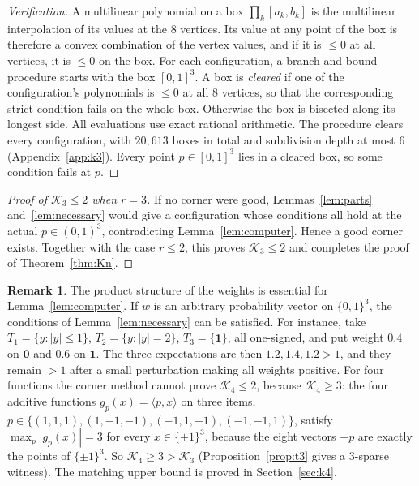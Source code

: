 \documentclass[11pt,letterpaper]{article}
\theoremstyle{definition}
\newtheorem{remark}[theorem]{Remark}
\newcommand{\cube}[1]{\{\pm1\}^{#1}}
\begin{document}
\begin{proof}[Verification]
A multilinear polynomial on a box $\prod_k[a_k,b_k]$ is the multilinear interpolation of its
values at the $8$ vertices. Its value at any point of the box is therefore a convex combination of
the vertex values, and if it is $\le0$ at all vertices, it is $\le0$ on the box. For each
configuration, a branch-and-bound procedure starts with the box $[0,1]^3$. A box is
\emph{cleared} if one of the configuration's polynomials is $\le0$ at all $8$ vertices, so that
the corresponding strict condition fails on the whole box. Otherwise the box is bisected along its
longest side. All evaluations use exact rational arithmetic. The procedure clears every
configuration, with $20{,}613$ boxes in total and subdivision depth at most $6$
(Appendix~\ref{app:k3}). Every point $p\in[0,1]^3$ lies in a cleared box, so some condition fails
at $p$.
\end{proof}

\begin{proof}[Proof of $\mathcal{K}_3\le2$ when $r=3$]
If no corner were good, Lemmas~\ref{lem:parts} and~\ref{lem:necessary} would give a configuration
whose conditions all hold at the actual $p\in(0,1)^3$, contradicting Lemma~\ref{lem:computer}.
Hence a good corner exists. Together with the case $r\le2$, this proves $\mathcal{K}_3\le2$ and completes
the proof of Theorem~\ref{thm:Kn}.
\end{proof}

\begin{remark}\label{rem:K4}
The product structure of the weights is essential for Lemma~\ref{lem:computer}. If $w$ is an
arbitrary probability vector on $\{0,1\}^3$, the conditions of Lemma~\ref{lem:necessary} can be
satisfied. For instance, take $T_1=\{y:|y|\le1\}$, $T_2=\{y:|y|=2\}$, $T_3=\{\mathbf 1\}$, all
one-signed, and put weight $0.4$ on $\mathbf 0$ and $0.6$ on $\mathbf 1$. The three expectations
are then $1.2,1.4,1.2>1$, and they remain $>1$ after a small perturbation making all weights
positive. For four functions the corner method cannot prove $\mathcal{K}_4\le2$, because $\mathcal{K}_4\ge3$: the four additive
functions $g_p(x)=\langle p,x\rangle$ on three items, $p\in\{(1,1,1),(1,-1,-1),(-1,1,-1),(-1,-1,1)\}$,
satisfy $\max_p|g_p(x)|=3$ for every $x\in\cube{3}$, because the eight vectors $\pm p$ are exactly the
points of $\cube3$. So $\mathcal{K}_4\ge3>\mathcal{K}_3$ (Proposition~\ref{prop:t3} gives a $3$-sparse witness). The
matching upper bound is proved in Section~\ref{sec:k4}.
\end{remark}
\end{document}
